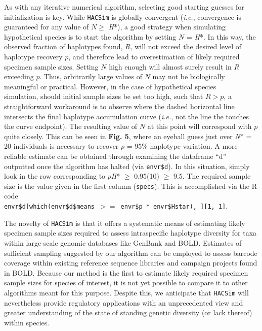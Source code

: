 As with any iterative numerical algorithm, selecting good starting guesses for \\ initialization is key. While {\tt HACSim} is globally convergent (\textit{i.e.}, convergence is guaranteed for any value of $N \geq$ \textit{H}*), a good strategy when simulating hypothetical species is to start the algorithm by setting $N$ = \textit{H}*. In this way, the observed fraction of haplotypes found, $R$, will not exceed the desired level of haplotype recovery $p$, and therefore lead to overestimation of likely required specimen sample sizes. Setting $N$ high enough will almost surely result in $R$ exceeding $p$. Thus, arbitrarily large values of $N$ may not be biologically meaningful or practical. However, in the case of hypothetical species \\ simulation, should initial sample sizes be set too high, such that $R > p$, a straightforward workaround is to observe where the dashed horizontal line intersects the final haplotype accumulation curve (\textit{i.e.}, not the line the touches the curve endpoint). The resulting value of $N$ at this point will correspond with $p$ quite closely. This can be seen in \textbf{Fig. 5}, where an eyeball guess just over \textit{N}* = 20 individuals is necessary to recover $p$ = 95\% haplotype variation. A more reliable estimate can be obtained through examining the dataframe ``d'' outputted once the algorithm has halted (via {\tt envr\$d}). In this situation, simply look in the row corresponding to $p$\textit{H}* $\geq$ 0.95(10) $\geq$ 9.5. The required sample size is the value given in the first column ({\tt specs}). This is accomplished via the R code \\ {\tt envr\$d[which(envr\$d\$means $>=$ envr\$p * envr\$Hstar), ][1, 1]}.



The novelty of {\tt HACSim} is that it offers a systematic means of estimating likely \\ specimen sample sizes required to assess intraspecific haplotype diversity for taxa within large-scale genomic databases like GenBank and BOLD. Estimates of sufficient sampling suggested by our algorithm can be employed to assess barcode coverage within existing reference sequence libraries and campaign projects found in BOLD. Because  our method is the first to estimate likely required specimen sample sizes for species of interest, it is not yet possible to compare it to other algorithms meant for this purpose. Despite this, we anticipate that {\tt HACSim} will nevertheless provide regulatory applications with an unprecedented view and greater understanding of the state of standing genetic diversity (or lack thereof) within species.    



